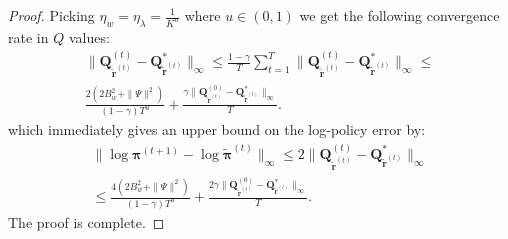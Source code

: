 \begin{proof}
Picking $\eta_{{w}}=\eta_{{\lambda}}= \frac{1}{K^u}$ where $u\in (0,1)$ we get the following convergence rate in $Q$ values:
\begin{align*}
    \|\bm{Q}^{(t)}_{\tilde{\bm{r}}^{(t)}}
    - \bm{Q}^*_{\tilde{\bm{r}}^{(t)}} \|_\infty 
    \leq 
    \frac{1-\gamma}{T} \sum^{T}_{t=1}   
    \|\bm{Q}^{(t)}_{\tilde{\bm{r}}^{(t)}}
    - \bm{Q}^*_{\tilde{\bm{r}}^{(t)}} \|_\infty
    \leq\\
    \frac{2(2 B_w^2+\|\Psi\|^2)}{(1 - \gamma)T^u}
    +
    \frac{\gamma 
    \|\bm{Q}^{(0)}_{\tilde{\bm{r}}^{(t)}}
    - \bm{Q}^*_{\tilde{\bm{r}}^{(t)}} \|_\infty
    }{T}.
 \end{align*}
which immediately gives an upper bound on the log-policy error by:
\begin{align*}
    \| \log \bm{\pi}^{(t+1)} - \log \tilde{\bm{\pi}}^{(t)} \|_\infty 
    \leq 2
    \|\bm{Q}^{(t)}_{\tilde{\bm{r}}^{(t)}}
    - \bm{Q}^*_{\tilde{\bm{r}}^{(t)}} \|_\infty \\
    \leq
    \frac{4(2 B_w^2+\|\Psi\|^2)}{(1 - \gamma)T^u} +
    \frac{2 \gamma 
    \|\bm{Q}^{(0)}_{\tilde{\bm{r}}^{(t)}}
    - \bm{Q}^*_{\tilde{\bm{r}}^{(t)}} \|_\infty
    }{T}.
 \end{align*}
 The proof is complete.
 
\end{proof}

